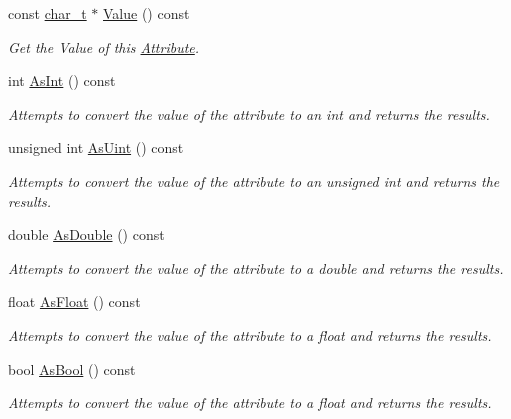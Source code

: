 \begin{DoxyCompactItemize}
const \hyperlink{namespacephys_1_1xml_afc87705cd1c2917d87b879715a2d8f6e}{char\_\-t} $\ast$ \hyperlink{classphys_1_1xml_1_1Attribute_a8a8099b39bca8894a8226ce0e82d3451}{Value} () const 
\begin{DoxyCompactList}\small\item\em Get the Value of this \hyperlink{classphys_1_1xml_1_1Attribute}{Attribute}. \item\end{DoxyCompactList}\item 
int \hyperlink{classphys_1_1xml_1_1Attribute_ada1f2e45ce636ad8482972263364e7fa}{AsInt} () const 
\begin{DoxyCompactList}\small\item\em Attempts to convert the value of the attribute to an int and returns the results. \item\end{DoxyCompactList}\item 
unsigned int \hyperlink{classphys_1_1xml_1_1Attribute_ad00ec5857fc4afcda892a0057419a9a0}{AsUint} () const 
\begin{DoxyCompactList}\small\item\em Attempts to convert the value of the attribute to an unsigned int and returns the results. \item\end{DoxyCompactList}\item 
double \hyperlink{classphys_1_1xml_1_1Attribute_a467ae167d5407ae3293a22b8873cb43a}{AsDouble} () const 
\begin{DoxyCompactList}\small\item\em Attempts to convert the value of the attribute to a double and returns the results. \item\end{DoxyCompactList}\item 
float \hyperlink{classphys_1_1xml_1_1Attribute_aad74f805b9318735011d698ee39113aa}{AsFloat} () const 
\begin{DoxyCompactList}\small\item\em Attempts to convert the value of the attribute to a float and returns the results. \item\end{DoxyCompactList}\item 
bool \hyperlink{classphys_1_1xml_1_1Attribute_a1c3e0f3a1722aac6a43daa135fdf622e}{AsBool} () const 
\begin{DoxyCompactList}\small\item\em Attempts to convert the value of the attribute to a float and returns the results. \item\end{DoxyCompactList}\item 

\end{DoxyCompactItemize}
